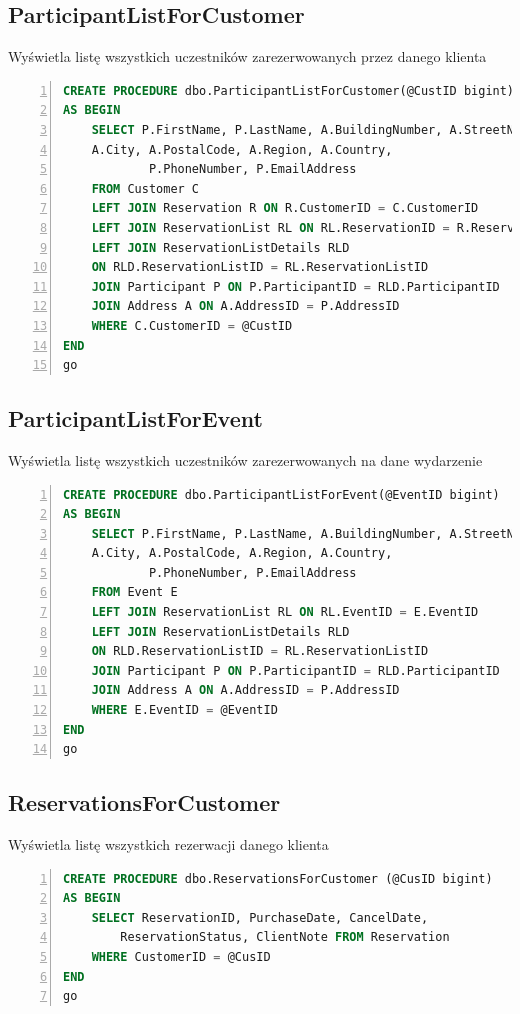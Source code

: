\documentclass[]{article}
\begin{document}
	\subsection{ParticipantListForCustomer}
	Wyświetla listę wszystkich uczestników zarezerwowanych przez danego klienta
	\begin{lstlisting}[language=SQL,
						showspaces=false,
						basicstyle=\ttfamily,
						numbers=left,
						numberstyle=\tiny,
						backgroundcolor=\color{lightg},
						keywordstyle=\color{lightblue},
						commentstyle=\color{gray}]
CREATE PROCEDURE dbo.ParticipantListForCustomer(@CustID bigint)
AS BEGIN
	SELECT P.FirstName, P.LastName, A.BuildingNumber, A.StreetName,
	A.City, A.PostalCode, A.Region, A.Country,
			P.PhoneNumber, P.EmailAddress
	FROM Customer C 
	LEFT JOIN Reservation R ON R.CustomerID = C.CustomerID
	LEFT JOIN ReservationList RL ON RL.ReservationID = R.ReservationID
	LEFT JOIN ReservationListDetails RLD
	ON RLD.ReservationListID = RL.ReservationListID
	JOIN Participant P ON P.ParticipantID = RLD.ParticipantID
	JOIN Address A ON A.AddressID = P.AddressID
	WHERE C.CustomerID = @CustID
END
go
	\end{lstlisting}
	
	\subsection{ParticipantListForEvent}
	Wyświetla listę wszystkich uczestników zarezerwowanych na dane wydarzenie
	\begin{lstlisting}[language=SQL,
						showspaces=false,
						basicstyle=\ttfamily,
						numbers=left,
						numberstyle=\tiny,
						backgroundcolor=\color{lightg},
						keywordstyle=\color{lightblue},
						commentstyle=\color{gray}]
CREATE PROCEDURE dbo.ParticipantListForEvent(@EventID bigint)
AS BEGIN
	SELECT P.FirstName, P.LastName, A.BuildingNumber, A.StreetName,
	A.City, A.PostalCode, A.Region, A.Country,
			P.PhoneNumber, P.EmailAddress
	FROM Event E
	LEFT JOIN ReservationList RL ON RL.EventID = E.EventID
	LEFT JOIN ReservationListDetails RLD
	ON RLD.ReservationListID = RL.ReservationListID
	JOIN Participant P ON P.ParticipantID = RLD.ParticipantID
	JOIN Address A ON A.AddressID = P.AddressID
	WHERE E.EventID = @EventID
END
go
	\end{lstlisting}
	\subsection{ReservationsForCustomer}
	Wyświetla listę wszystkich rezerwacji danego klienta
	\begin{lstlisting}[language=SQL,
						showspaces=false,
						basicstyle=\ttfamily,
						numbers=left,
						numberstyle=\tiny,
						backgroundcolor=\color{lightg},
						keywordstyle=\color{lightblue},
						commentstyle=\color{gray}]
CREATE PROCEDURE dbo.ReservationsForCustomer (@CusID bigint)
AS BEGIN
	SELECT ReservationID, PurchaseDate, CancelDate,
		ReservationStatus, ClientNote FROM Reservation
	WHERE CustomerID = @CusID
END
go
	\end{lstlisting}
	
\end{document}
